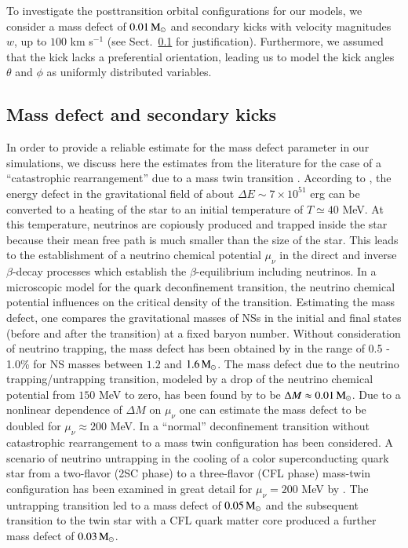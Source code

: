 \documentclass[main.tex]{subfiles}
\begin{document}
        To investigate the posttransition orbital configurations for our models, we consider a mass defect of $0.01\mathrm{\,M_\odot}$
        and secondary kicks with velocity magnitudes $w$, up to $100$ km s$^{-1}$ (see Sect.~\ref{sec:mass_defect} for justification). Furthermore, we assumed that the kick lacks a preferential orientation, leading us to model the kick angles $\theta$ and $\phi$ as uniformly distributed variables. 
    
    \subsection{Mass defect and secondary kicks}\label{sec:mass_defect}
        In order to provide a reliable estimate for the mass defect parameter in our simulations, we discuss here the estimates from the literature for the case of a ``catastrophic rearrangement'' due to a mass twin transition \citep{Mishustin:2002xe}. According to \cite{Mishustin:2002xe}, the energy defect in the gravitational field of about $\Delta E \sim  7 \times 10^{51}$ erg can be converted to a heating of the star to an initial temperature of $T\simeq 40$ MeV. 
        At this temperature, neutrinos are copiously produced and trapped inside the star because their mean free path is much smaller than the size of the star.
        This leads to the establishment of a neutrino chemical potential $\mu_\nu$ in the direct and inverse $\beta$-decay processes which establish the $\beta$-equilibrium including neutrinos. In a microscopic model for the quark deconfinement transition, the neutrino chemical potential influences on the critical density of the transition. 
        Estimating the mass defect, one compares the gravitational masses of NSs in the initial and final states (before and after the transition) at a fixed baryon number. Without consideration of neutrino trapping, the mass defect has been obtained by \cite{2021AN....342..234A} in the range of 0.5 - 1.0\% for NS masses between $1.2$ and $1.6\mathrm{\,M_\odot}$.
        The mass defect due to the neutrino trapping/untrapping transition, modeled by a drop of the neutrino chemical potential from $150$ MeV to zero, has been found by \cite{Aguilera:2002dh} to be $\Delta M \approx 0.01\mathrm{\,M_\odot}$. Due to a nonlinear dependence of $\Delta M$ on $\mu_\nu$ one can estimate the mass defect to be doubled for $\mu_\nu\approx 200$ MeV. 
        In \cite{Aguilera:2002dh} a ``normal'' deconfinement transition without catastrophic rearrangement to a mass twin configuration has been considered. 
        A scenario of neutrino untrapping in the cooling of a color superconducting quark star from a two-flavor (2SC phase) to a three-flavor (CFL phase) mass-twin configuration has been examined in great detail for $\mu_\nu = 200$ MeV by \cite{Sandin:2007zr}. The untrapping transition led to a mass defect of $0.05\mathrm{\,M_\odot}$ and the subsequent transition to the twin star with a CFL quark matter core produced a further mass defect of $0.03\mathrm{\,M_\odot}$.
        
\end{document}
